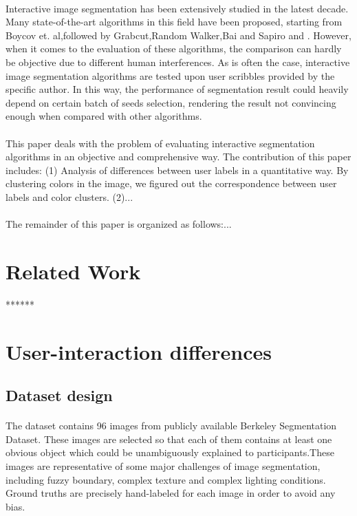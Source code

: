 \documentclass[runningheads,a4paper]{llncs}
\begin{document}
  \paragraph{}Interactive image segmentation has been extensively studied in the latest decade. Many state-of-the-art algorithms in this field have been proposed, starting from Boycov et. al\citep{boykov2001interactive},followed by Grabcut\citep{rother2004grabcut},Random Walker\citep{grady2006random},Bai and Sapiro \citep{bai2007geodesic} and \citep{gulshan2010geodesic}. However, when it comes to the evaluation of these algorithms, the comparison can hardly be objective due to different human interferences. As is often the case, interactive image segmentation algorithms are tested upon user scribbles provided by the specific author. In this way, the performance of segmentation result could heavily depend on certain batch of seeds selection, rendering the result not convincing enough when compared with other algorithms. 
 \paragraph{}This paper deals with the problem of evaluating interactive segmentation algorithms in an objective and comprehensive way. The contribution of this paper includes: (1)  Analysis of differences between user labels in a quantitative way. By clustering colors in the image, we figured out the correspondence between user labels and color clusters. 
 (2)...
 \paragraph{} The remainder of this paper is organized as follows:...
  
\section{Related Work}

******

\section{User-interaction differences}

\subsection{Dataset design}
\paragraph{}The dataset contains 96 images from publicly available Berkeley Segmentation Dataset\citep{martin2001database}. These images are selected so that each of them contains at least one obvious object which could be unambiguously explained to participants.These images are representative of some major challenges of image segmentation, including fuzzy boundary, complex texture and complex lighting conditions. Ground truths are precisely hand-labeled for each image in order to avoid any bias.
\end{document}
